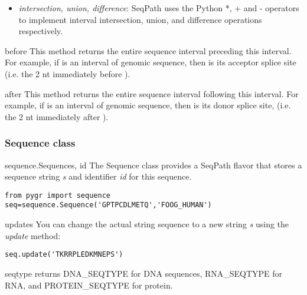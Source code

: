 \documentclass{howto}
\begin{document}
\begin{itemize}
\item
{\em intersection, union, difference}: SeqPath uses the Python *, + and - 
operators to implement interval intersection, union, and difference
operations respectively.

\end{itemize}

\begin{funcdesc}{before}{} 
  This method returns the entire sequence interval preceding this interval.
  For example, if  is an interval of genomic sequence, then
   is its acceptor splice site (i.e. the 2 nt immediately
  before ).
\end{funcdesc}

\begin{funcdesc}{after}{} 
  This method returns the entire sequence interval following this interval.
  For example, if  is an interval of genomic sequence, then
   is its donor splice site, (i.e. the 2 nt immediately
  after ).
\end{funcdesc}


\subsubsection{Sequence class}

\begin{funcdesc}{sequence.Sequence}{s, id}
  The Sequence class provides a SeqPath flavor that stores a sequence string
  {\em s} and identifier {\em id} for this sequence.

\begin{verbatim}
from pygr import sequence
seq=sequence.Sequence('GPTPCDLMETQ','FOOG_HUMAN')
\end{verbatim}
\end{funcdesc}


\begin{funcdesc}{update}{s}
  You can change the actual string sequence to a new string {\em s}
  using the {\em update} method:

\begin{verbatim}
seq.update('TKRRPLEDKMNEPS')
\end{verbatim}
\end{funcdesc}

\begin{funcdesc}{seqtype}{}
  returns DNA_SEQTYPE for DNA sequences, 
  RNA_SEQTYPE for RNA, and PROTEIN_SEQTYPE for protein.
\end{funcdesc}
\end{document}
